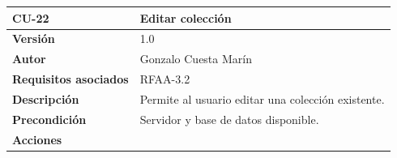 \documentclass[
]{article}
\begin{document}
\begin{longtable}[]{@{}ll@{}}
\toprule
\begin{minipage}[b]{0.19\columnwidth}\raggedright
\textbf{CU-22}\strut
\end{minipage} & \begin{minipage}[b]{0.75\columnwidth}\raggedright
\textbf{Editar colección}\strut
\end{minipage}\tabularnewline
\midrule
\endhead
\begin{minipage}[t]{0.19\columnwidth}\raggedright
\textbf{Versión}\strut
\end{minipage} & \begin{minipage}[t]{0.75\columnwidth}\raggedright
1.0\strut
\end{minipage}\tabularnewline
\begin{minipage}[t]{0.19\columnwidth}\raggedright
\textbf{Autor}\strut
\end{minipage} & \begin{minipage}[t]{0.75\columnwidth}\raggedright
Gonzalo Cuesta Marín\strut
\end{minipage}\tabularnewline
\begin{minipage}[t]{0.19\columnwidth}\raggedright
\textbf{Requisitos asociados}\strut
\end{minipage} & \begin{minipage}[t]{0.75\columnwidth}\raggedright
RFAA-3.2\strut
\end{minipage}\tabularnewline
\begin{minipage}[t]{0.19\columnwidth}\raggedright
\textbf{Descripción}\strut
\end{minipage} & \begin{minipage}[t]{0.75\columnwidth}\raggedright
Permite al usuario editar una colección existente.\strut
\end{minipage}\tabularnewline
\begin{minipage}[t]{0.19\columnwidth}\raggedright
\textbf{Precondición}\strut
\end{minipage} & \begin{minipage}[t]{0.75\columnwidth}\raggedright
Servidor y base de datos disponible.\strut
\end{minipage}\tabularnewline
\begin{minipage}[t]{0.19\columnwidth}\raggedright
\textbf{Acciones}\strut
\end{minipage} & \begin{minipage}[t]{0.75\columnwidth}\raggedright
\begin{enumerate}
\def\labelenumi{\arabic{enumi}.}

\end{enumerate}
\end{minipage}
\end{longtable}
\end{document}
